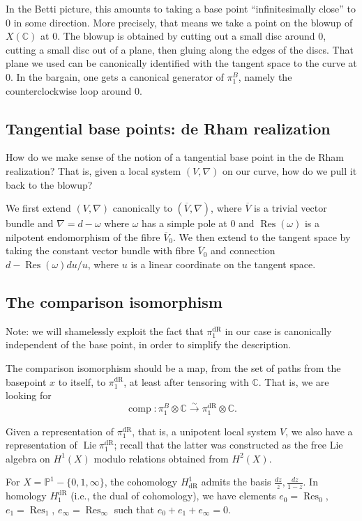 \documentclass[12pt]{article}
\def\CC{\mathbb{C}}
\def\PP{\mathbb{P}}
\DeclareMathOperator{\comp}{comp}
\DeclareMathOperator{\dR}{dR}
\DeclareMathOperator{\Lie}{Lie}
\DeclareMathOperator{\Res}{Res}
\begin{document}
In the Betti picture, this amounts to taking a base point ``infinitesimally
close'' to 0 in some direction. More precisely, that means we take a
point on the blowup of $X(\CC)$ at 0. The blowup is obtained by
cutting out a small disc around 0, cutting a small disc out of
a plane, then gluing along the edges of the discs. That plane we
used can be canonically identified with the tangent space to the curve
at 0.
In the bargain, one gets a canonical generator
of $\pi_1^B$, namely the counterclockwise loop around 0.

\subsection*{Tangential base points: de Rham realization}

How do we make sense of the notion of a tangential base point in the 
de Rham realization? That is, given a local system $(V, \nabla)$ on
our curve, how do we pull it back to the blowup?

We first extend $(V, \nabla)$ canonically to $(\overline{V}, \nabla)$,
where $\overline{V}$ is a trivial vector bundle and $\nabla = d - \omega$
where $\omega$ has a simple pole at 0 and $\Res(\omega)$ is a nilpotent
endomorphism of the fibre $\overline{V}_0$. We then extend
to the tangent space by taking the constant vector bundle with fibre
$\overline{V}_0$ and connection $d - \Res(\omega) du/u$, where $u$
is a linear coordinate on the tangent space.

\subsection*{The comparison isomorphism}

Note: we will shamelessly exploit the fact that $\pi_1^{\dR}$ in our case
is canonically independent of the base point, in order to simplify the
description.

The comparison isomorphism should be a map, from the set of paths
from the basepoint $x$ to itself, to $\pi_1^{\dR}$, at least after 
tensoring with $\CC$. That is, we are looking for
\[
\comp: \pi_1^B \otimes \CC \stackrel{\sim}{\to} \pi_1^{\dR} \otimes \CC.
\]

Given a representation of $\pi_1^{\dR}$, that is, a unipotent local
system $V$, we also have a representation of $\Lie \pi_1^{\dR}$;
recall that the latter was constructed as the free Lie algebra on
$H^1(X)$ modulo relations obtained from $H^2(X)$.

For $X = \PP^1 - \{0, 1, \infty\}$, the cohomology $H^1_{\dR}$
admits the basis $\frac{dz}{z}, \frac{dz}{1-z}$. In homology
$H_1^{\dR}$ (i.e., the dual of cohomology), we have elements
$e_0 = \Res_0$, $e_1 = \Res_1$, $e_\infty = \Res_{\infty}$
such that $e_0 + e_1 + e_\infty = 0$.
\end{document}
